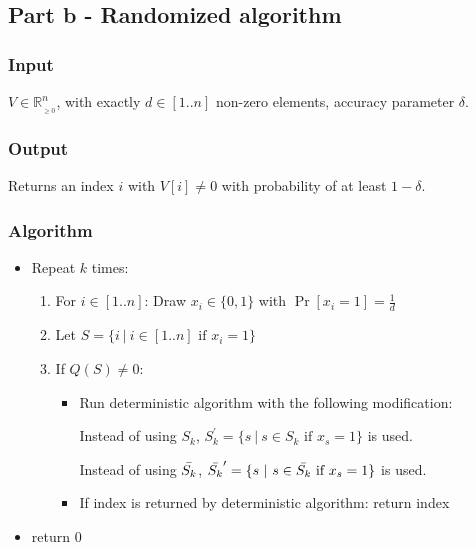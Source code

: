 \subsection*{Part b - Randomized algorithm}

\subsubsection*{Input}

$V \in \mathbb{R}_{_{\geq 0}}^n$, with exactly $d \in [1..n]$ non-zero elements, accuracy parameter $\delta$.

\subsubsection*{Output}

Returns an index $i$ with $V[i] \neq 0$ with probability of at least $1 - \delta$.

\subsubsection*{Algorithm}

\begin{itemize}
    \item Repeat $k$ times:
    \begin{enumerate}
        \item For $i \in [1..n]$: Draw $x_i \in \{0, 1\}$ with $\Pr[x_i = 1] = \frac{1}{d}$ 
        
        \item Let $S = \{i ~| ~ i \in [1..n] \text{ if } x_i = 1\}$
        
        \item If $Q(S) \neq 0$:
                
        \begin{itemize}
            \item Run deterministic algorithm with the following modification:
            
            Instead of using $S_k$, $S_k^\prime = \{s ~ | ~ s \in S_k \text{ if } x_s = 1\}$ is used.
            
            Instead of using $\Bar{S_k}$, $\Bar{S_k}^\prime = \{s ~ | ~ s \in \Bar{S_k} \text{ if } x_s = 1\}$ is used.
            
            \item If index is returned by deterministic algorithm: return index
            
        \end{itemize}
        
    \end{enumerate} 
    
    \item return $0$
\end{itemize} 

